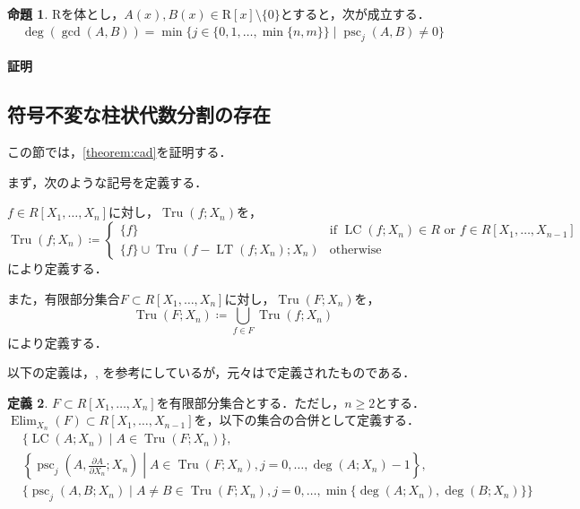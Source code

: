 \documentclass[uplatex, dvipdfmx]{jsarticle}
\makeatletter
\numberwithin{equation}{section}
\renewenvironment{proof}[1][\proofname]{\par
  \pushQED{\qed}%
  \normalfont \topsep6\p@\@plus6\p@\relax
  \trivlist
  \item\relax
  {\bfseries
  #1\@addpunct{.}}\hspace\labelsep\ignorespaces
}{
  \popQED\endtrivlist\@endpefalse
}
\DeclareMathOperator{\psc}{psc}
\DeclareMathOperator{\PSC}{PSC}
\DeclareMathOperator{\Elim}{Elim}
\DeclareMathOperator{\Tru}{Tru}
\DeclareMathOperator{\LT}{LT}
\DeclareMathOperator{\LC}{LC}
\theoremstyle{definition}
\newtheorem{definition}{定義}[section]
\newtheorem{proposition}[definition]{命題}
\renewcommand{\proofname}{\textbf{証明}}
\makeatother
\begin{document}
\begin{proposition}\label{proposition:psc}
$\mathrm{R}$を体とし，$A(x), B(x) \in \mathrm{R}[x] \setminus \{0\}$とすると，次が成立する．
\begin{align}
\deg(\gcd(A, B)) = \min \{ j  \in \{0,1, \dots, \min\{n,m\}\}\mid \psc_j(A,B) \neq 0\}
\end{align}
\end{proposition}

\begin{proof}
\end{proof}

\subsection{符号不変な柱状代数分割の存在}
この節では，\cref{theorem:cad}を証明する．

まず，次のような記号を定義する．

$f \in R[X_1, \dots, X_n]$に対し，$\Tru(f;X_n)$を，
\begin{equation}
     \Tru(f;X_n)\coloneqq \begin{cases}
          \{f\} &  \text{if $\LC(f; X_n) \in R$ or $f \in R[X_1, \dots, X_{n-1}]$} \\
          \{f\} \cup \Tru(f-\LT(f;X_n);X_n) & \text{otherwise}
     \end{cases}
\end{equation}
により定義する．

また，有限部分集合$F \subset R[X_1, \dots, X_n]$に対し，$\Tru(F;X_n)$を，
\begin{equation}
     \Tru(F;X_n) \coloneqq \bigcup_{f \in F} \Tru(f;X_n)
\end{equation}
により定義する．

以下の定義は，\cite[Section 3]{MR0764184}, \cite[Notation 5.15.]{MR2248869}
を参考にしているが，元々は\cite[Theorem 4]{MR0403962}で定義されたものである．


\begin{definition}
$F \subset R[X_1, \dots, X_n]$を有限部分集合とする．ただし，$n \geq 2$とする．
$\Elim_{X_n}(F) \subset R[X_1, \dots, X_{n-1}]$を，以下の集合の合併として定義する．
\begin{align} 
     &\{\LC(A;X_n) \mid A \in \Tru(F;X_n) \},\\
     &\left\{ \psc_j\left(A,\frac{\partial A}{\partial X_n};X_n\right) \middle| A \in \Tru(F;X_n), j= 0, \dots, \deg(A;X_n)-1\right\},\\
     &\{\psc_j(A,B;X_n) \mid A \neq B \in \Tru(F; X_n), j = 0, \dots, \min\{\deg(A;X_n), \deg(B;X_n)\}\}
\end{align}
\end{definition}
\end{document}
